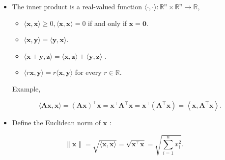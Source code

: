 \documentclass[12pt,thmsa]{article}
\begin{document}
\begin{itemize}
	\item The inner product is a real-valued function \(\langle\cdot, \cdot\rangle: \mathbb{R}^{n} \times \mathbb{R}^{n} \rightarrow \mathbb{R}\),
	
	\begin{itemize}
		\item        \( \langle\boldsymbol{x}, \boldsymbol{x}\rangle \geq 0,\langle\boldsymbol{x}, \boldsymbol{x}\rangle=0 \) if and only if \(\boldsymbol{x}=\mathbf{0}\).
		
		\item      \(\langle\boldsymbol{x}, \boldsymbol{y}\rangle=\langle\boldsymbol{y}, \boldsymbol{x}\rangle\).
		
		\item        \(\langle\boldsymbol{x}+\boldsymbol{y}, \boldsymbol{z}\rangle=\langle\boldsymbol{x}, \boldsymbol{z}\rangle+\langle\boldsymbol{y}, \boldsymbol{z}\rangle\) .
		
		\item \(\langle r \boldsymbol{x}, \boldsymbol{y}\rangle=r\langle\boldsymbol{x}, \boldsymbol{y}\rangle\) for every \(r \in \mathbb{R}\).
	\end{itemize}
	Example,
	
	\begin{equation*}
		\langle\boldsymbol{A} \boldsymbol{x}, \boldsymbol{x}\rangle=
		\left( \boldsymbol{A} \boldsymbol{x} \right)^{\top} \boldsymbol{x} = 
		\boldsymbol{x}^{\top}  \boldsymbol{A}^{\top} \boldsymbol{x} = 
		\boldsymbol{x}^{\top}  \left(\boldsymbol{A}^{\top} \boldsymbol{x} \right) = 
		\left\langle\boldsymbol{x}, \boldsymbol{A}^{\top} \boldsymbol{x}\right\rangle.
	\end{equation*}
	
	
	\item Define the \underline{Euclidean norm} of \(\boldsymbol{x}\) :
	
\end{itemize}

\begin{equation*}
	\|\boldsymbol{x}\|=\sqrt{\langle\boldsymbol{x}, \boldsymbol{x}\rangle}=\sqrt{\boldsymbol{x}^{\top} \boldsymbol{x}}=\sqrt{\sum_{i=1}^{n} x_{i}^{2}}.
\end{equation*}
\end{document}
